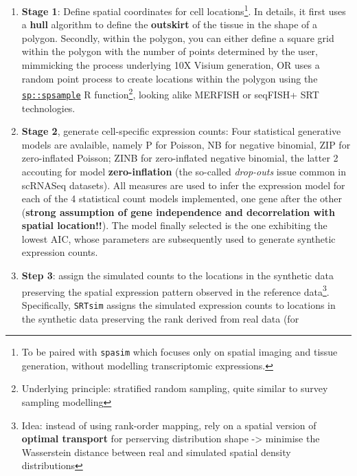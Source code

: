 \documentclass[
  letterpaper,
]{book}
\providecommand{\tightlist}{%
  \setlength{\itemsep}{0pt}\setlength{\parskip}{0pt}}\usepackage{longtable,booktabs,array}
\begin{document}
\begin{itemize}
\begin{itemize}
    \begin{enumerate}
    \def\labelenumi{\arabic{enumi}.}
    \tightlist
    \item
      \textbf{Stage 1}: Define spatial coordinates for cell
      locations\footnote{To be paired with \texttt{spasim} which focuses
        only on spatial imaging and tissue generation, without modelling
        transcriptomic expressions.}. In details, it first uses a
      \textbf{hull} algorithm to define the \textbf{outskirt} of the
      tissue in the shape of a polygon. Secondly, within the polygon,
      you can either define a square grid within the polygon with the
      number of points determined by the user, mimmicking the process
      underlying 10X Visium generation, OR uses a random point process
      to create locations within the polygon using the
      \href{https://www.rdocumentation.org/packages/sp/versions/2.1-4/topics/spsample}{\texttt{sp::spsample}}
      R function\footnote{Underlying principle: stratified random
        sampling, quite similar to survey sampling modelling}, looking
      alike MERFISH or seqFISH+ SRT technologies.
    \item
      \textbf{Stage 2}, generate cell-specific expression counts: Four
      statistical generative models are avalaible, namely P for Poisson,
      NB for negative binomial, ZIP for zero-inflated Poisson; ZINB for
      zero-inflated negative binomial, the latter 2 accouting for model
      \textbf{zero-inflation} (the so-called \emph{drop-outs} issue
      common in scRNASeq datasets). All measures are used to infer the
      expression model for each of the 4 statistical count models
      implemented, one gene after the other (\textbf{strong assumption
      of gene independence and decorrelation with spatial location!!}).
      The model finally selected is the one exhibiting the lowest AIC,
      whose parameters are subsequently used to generate synthetic
      expression counts.
    \item
      \textbf{Step 3}: assign the simulated counts to the locations in
      the synthetic data preserving the spatial expression pattern
      observed in the reference data\footnote{Idea: instead of using
        rank-order mapping, rely on a spatial version of \textbf{optimal
        transport} for perserving distribution shape -\textgreater{}
        minimise the Wasserstein distance between real and simulated
        spatial density distributions}. Specifically, \texttt{SRTsim}
      assigns the simulated expression counts to locations in the
      synthetic data preserving the rank derived from real data (for

\end{enumerate}
\end{itemize}
\end{itemize}
\end{document}
